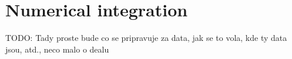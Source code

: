 \section{Numerical integration}
TODO: Tady proste bude co se pripravuje za data, jak se to vola, kde ty data jsou, atd., neco malo o dealu